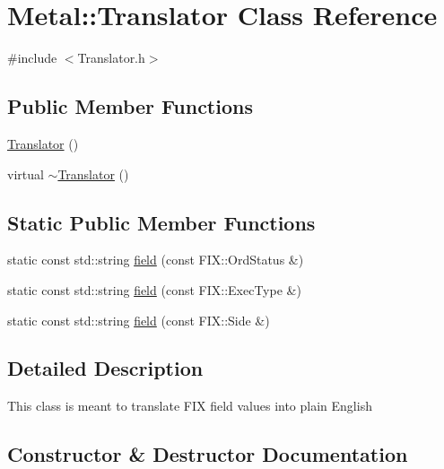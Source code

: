 \hypertarget{classMetal_1_1Translator}{}\section{Metal\+:\+:Translator Class Reference}
\label{classMetal_1_1Translator}


{\ttfamily \#include $<$Translator.\+h$>$}

\subsection*{Public Member Functions}
\begin{DoxyCompactItemize}
\item 
\hyperlink{classMetal_1_1Translator_a030bdd567db5d505e04e1fe64fda174d}{Translator} ()
\item 
virtual \hyperlink{classMetal_1_1Translator_ac9e56b0e458e14558a3512f889e24dc1}{$\sim$\+Translator} ()
\end{DoxyCompactItemize}
\subsection*{Static Public Member Functions}
\begin{DoxyCompactItemize}
\item 
static const std\+::string \hyperlink{classMetal_1_1Translator_a3a9953b65baf38dbc4c2ea835a005cf5}{field} (const F\+I\+X\+::\+Ord\+Status \&)
\item 
static const std\+::string \hyperlink{classMetal_1_1Translator_a726f01b6ba7f36a0c77ab2fb098acf37}{field} (const F\+I\+X\+::\+Exec\+Type \&)
\item 
static const std\+::string \hyperlink{classMetal_1_1Translator_a8297f6329e8de18e50547746ea84ee59}{field} (const F\+I\+X\+::\+Side \&)
\end{DoxyCompactItemize}


\subsection{Detailed Description}
This class is meant to translate F\+I\+X field values into plain English 

\subsection{Constructor \& Destructor Documentation}
\hypertarget{classMetal_1_1Translator_a030bdd567db5d505e04e1fe64fda174d}{}
